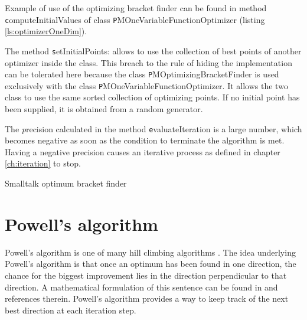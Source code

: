 Example of use of the optimizing bracket finder can be found in
method {\texttt computeInitialValues} of class {\texttt
PMOneVariableFunctionOptimizer} (\cf listing
\ref{ls:optimizerOneDim}).

The method {\texttt setInitialPoints:} allows to use the collection of
best points of another optimizer inside the class. This breach to
the rule of hiding the implementation can be tolerated here
because the class {\texttt PMOptimizingBracketFinder} is used
exclusively with the class {\texttt PMOneVariableFunctionOptimizer}.
It allows the two class to use the same sorted collection of
optimizing points. If no initial point has been supplied, it is
obtained from a random generator.

The {\textsl precision} calculated in the method {\texttt
evaluateIteration} is a large number, which becomes negative as
soon as the condition to terminate the algorithm is met. Having a
negative precision causes an iterative process as defined in
chapter \ref{ch:iteration} to stop.

\begin{listing} Smalltalk optimum bracket finder \label{ls:optimizerbracket}

\end{listing}


\section{Powell's algorithm}
\label{sec:powell}Powell's algorithm is one of many hill climbing
algorithms \cite{Press}. The idea underlying Powell's algorithm is
that once an optimum has been found in one direction, the chance
for the biggest improvement lies in the direction perpendicular to
that direction. A mathematical formulation of this sentence can be
found in \cite{Press} and references therein. Powell's algorithm
provides a way to keep track of the next best direction at each
iteration step.

